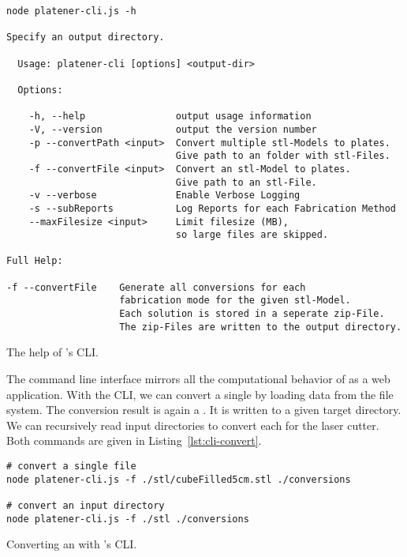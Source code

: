 \documentclass[../ClassicThesis.tex]{subfiles}
\begin{document}
\begin{listing}[!h]
\begin{verbatim}
node platener-cli.js -h

Specify an output directory.

  Usage: platener-cli [options] <output-dir>

  Options:

    -h, --help                output usage information
    -V, --version             output the version number
    -p --convertPath <input>  Convert multiple stl-Models to plates.
                              Give path to an folder with stl-Files.
    -f --convertFile <input>  Convert an stl-Model to plates.
                              Give path to an stl-File.
    -v --verbose              Enable Verbose Logging
    -s --subReports           Log Reports for each Fabrication Method
    --maxFilesize <input>     Limit filesize (MB),
                              so large files are skipped.

Full Help:

-f --convertFile    Generate all conversions for each
                    fabrication mode for the given stl-Model.
                    Each solution is stored in a seperate zip-File.
                    The zip-Files are written to the output directory.
\end{verbatim}
\caption{The help of {\platener}'s CLI.}
\label{lst:cli-help}
\end{listing}


The command line interface mirrors all the computational behavior of
{\platener} as a web application. With the CLI, we can convert a
single {\threedmodel} by loading data from the file system. The
conversion result is again a {\zipfile}. It is written to a given
target directory. We can recursively read input directories to
convert each {\stlfile} for the laser cutter. Both commands are given
in Listing~\ref{lst:cli-convert}.


\begin{listing}[!h]
\begin{verbatim}
# convert a single file
node platener-cli.js -f ./stl/cubeFilled5cm.stl ./conversions

# convert an input directory
node platener-cli.js -f ./stl ./conversions
\end{verbatim}
\caption{Converting an {\stlfile} with {\platener}'s CLI.}
\label{lst:cli-convert}
\end{listing}
\end{document}
